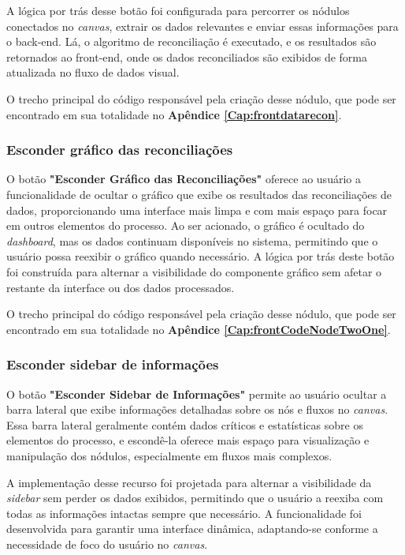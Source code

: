 A lógica por trás desse botão foi configurada para percorrer os nódulos conectados no \textit{canvas}, extrair os dados relevantes e enviar essas informações para o back-end. Lá, o algoritmo de reconciliação é executado, e os resultados são retornados ao front-end, onde os dados reconciliados são exibidos de forma atualizada no fluxo de dados visual.

O trecho principal do código responsável pela criação desse nódulo, que pode ser encontrado em sua totalidade no \textbf{Apêndice \ref{Cap:frontdatarecon}}.

\subsubsection{Esconder gráfico das reconciliações}

O botão \textbf{"Esconder Gráfico das Reconciliações"} oferece ao usuário a funcionalidade de ocultar o gráfico que exibe os resultados das reconciliações de dados, proporcionando uma interface mais limpa e com mais espaço para focar em outros elementos do processo. Ao ser acionado, o gráfico é ocultado do \textit{dashboard}, mas os dados continuam disponíveis no sistema, permitindo que o usuário possa reexibir o gráfico quando necessário. A lógica por trás deste botão foi construída para alternar a visibilidade do componente gráfico sem afetar o restante da interface ou dos dados processados.

O trecho principal do código responsável pela criação desse nódulo, que pode ser encontrado em sua totalidade no \textbf{Apêndice \ref{Cap:frontCodeNodeTwoOne}}.

\subsubsection{Esconder sidebar de informações}

O botão \textbf{"Esconder Sidebar de Informações"} permite ao usuário ocultar a barra lateral que exibe informações detalhadas sobre os nós e fluxos no \textit{canvas}. Essa barra lateral geralmente contém dados críticos e estatísticas sobre os elementos do processo, e escondê-la oferece mais espaço para visualização e manipulação dos nódulos, especialmente em fluxos mais complexos. 

A implementação desse recurso foi projetada para alternar a visibilidade da \textit{sidebar} sem perder os dados exibidos, permitindo que o usuário a reexiba com todas as informações intactas sempre que necessário. A funcionalidade foi desenvolvida para garantir uma interface dinâmica, adaptando-se conforme a necessidade de foco do usuário no \textit{canvas}.


